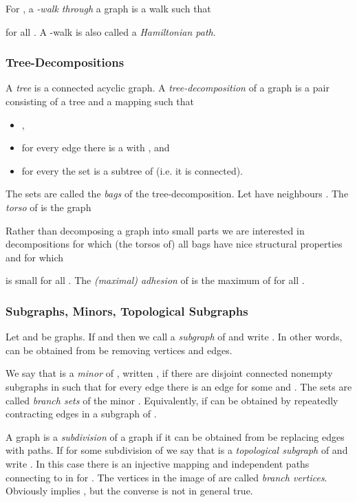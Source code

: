 \documentclass[12pt]{amsart}
\begin{document}
For , a \emph{-walk through} a graph  is a
walk  such that 

for all .
A -walk is also called a \emph{Hamiltonian path}. 





\subsubsection*{Tree-Decompositions}

A \emph{tree} is a connected acyclic graph.
A \emph{tree-decomposition} of a graph  is a pair
 consisting of a tree  and a mapping  such that
\begin{itemize}
\item ,
\item for every edge  there is a  with , and
\item for every  the set  is a
  subtree of  (i.e. it is connected).
\end{itemize}
The sets  are called the \emph{bags} of the
tree-decomposition. Let  have neighbours
. The \emph{torso}  of
 is the graph


Rather than decomposing a graph  into small parts we are interested
in decompositions  for which (the torsos of) all bags
 have nice structural properties and for which

is small for all . The \emph{(maximal) adhesion} of
 is the maximum of  for all
.

\subsubsection*{Subgraphs, Minors, Topological Subgraphs}

Let  and  be graphs. If  and  then we call  a \emph{subgraph} of  and write . In other words,  can be obtained from  be removing
vertices and edges.

We say that  is a \emph{minor} of , written , if
there are disjoint connected nonempty subgraphs  in
 such that for every edge  there is an edge 
for some  and . The sets  are
called \emph{branch sets} of the minor . Equivalently,  if  can be obtained by repeatedly contracting edges in a
subgraph of .

A graph  is a \emph{subdivision} of a graph  if it can be
obtained from  be replacing edges with paths. If  for
some subdivision  of  we say that  is a \emph{topological
  subgraph} of  and write . In this case there is an
injective mapping  and independent paths
 connecting  to  in  for
. The vertices in the image of  are called
\emph{branch vertices}. Obviously  implies ,
but the converse is not in general true.
\end{document}
